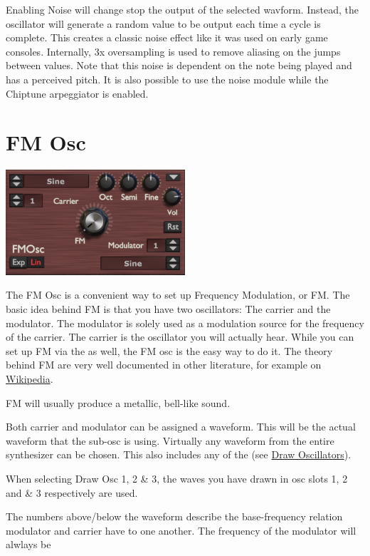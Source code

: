 Enabling Noise will change stop the output of the selected wavform. Instead, the oscillator will generate a random value to be output each time a cycle is complete. This creates a classic noise effect like it was used on early game consoles. Internally, 3x oversampling is used to remove aliasing on the jumps between values. Note that this noise is dependent on the note being played and has a perceived pitch. It is also possible to use the noise module while the Chiptune arpeggiator is enabled.

\section{FM Osc}
\begin{center}
    \includegraphics[width=0.5\textwidth]{graphics/fm_osc.png}
\end{center}
The FM Osc is a convenient way to set up Frequency Modulation, or FM. The basic idea behind FM is that you have two oscillators: The carrier and the modulator. The modulator is solely used as a modulation source for the frequency of the carrier. The carrier is the oscillator you will actually hear. While you can set up FM via the \modmatrix as well, the FM osc is the easy way to do it. The theory behind FM are very well documented in other literature, for example on \hyperlink{https://de.wikipedia.org/wiki/FM-Synthese}{Wikipedia}.

FM will usually produce a metallic, bell-like sound.

Both carrier and modulator can be assigned a waveform. This will be the actual waveform that the sub-osc is using. Virtually any waveform from the entire synthesizer can be chosen. This also includes any of the (see \hyperref[wavedraw]{Draw Oscillators}).

When selecting  Draw Osc 1, 2 \& 3, the waves you have drawn in osc slots 1, 2 and \& 3 respectively are used.

The numbers above/below the waveform describe the base-frequency relation modulator and carrier have to one another. The frequency of the modulator will alwlays be

